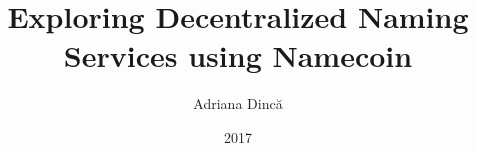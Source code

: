 \title{Exploring Decentralized Naming Services using Namecoin}
\author{Adriana Dincă}
\date{2017}


\newcommand{\project}{Exploring Decentralized Naming Services using Namecoin}

